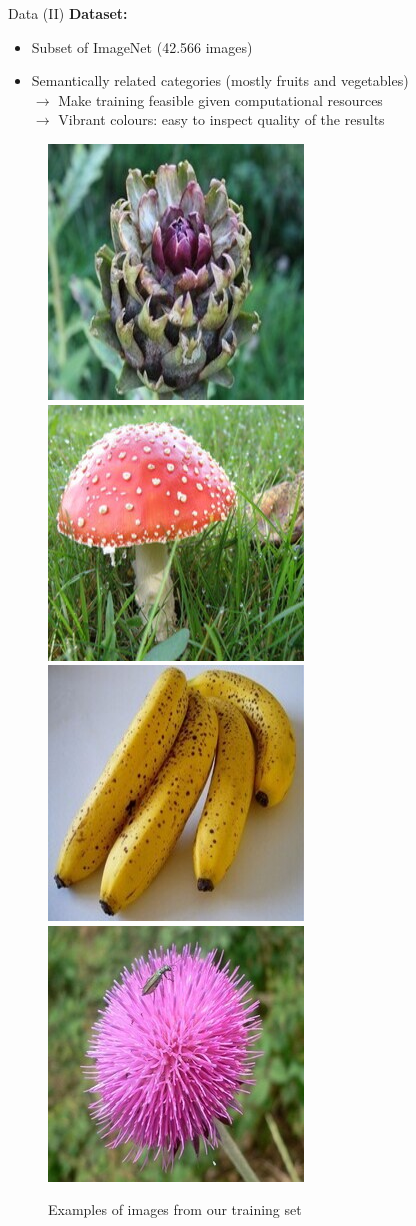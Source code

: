 \documentclass{beamer}
\begin{document}
\begin{frame}{Data (II)}
  \textbf{Dataset:}
    \begin{itemize}
      \item Subset of ImageNet (42.566 images)
      \item Semantically related categories (mostly fruits and vegetables) \\
            $\rightarrow$ Make training feasible given computational resources \\
            $\rightarrow$ Vibrant colours: easy to inspect quality of the results
    \end{itemize}

  \medskip

  \begin{figure}
    \includegraphics[width=.23\linewidth]{resources/veg1.jpg}\hfill
    \includegraphics[width=.23\linewidth]{resources/veg2.jpg}\hfill
    \includegraphics[width=.23\linewidth]{resources/veg3.jpg}\hfill
    \includegraphics[width=.23\linewidth]{resources/veg4.jpg}
    \caption{Examples of images from our training set}
  \end{figure}
\end{frame}
\end{document}
